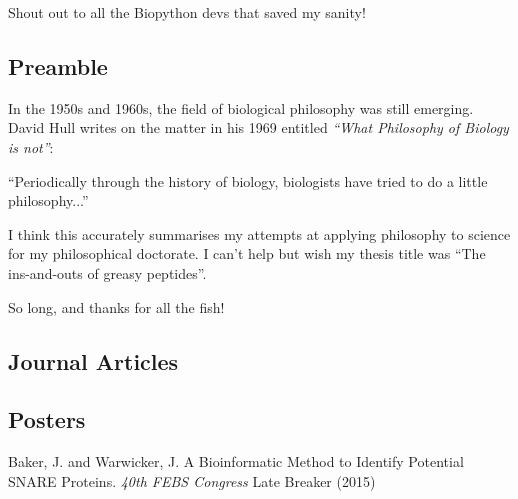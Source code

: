 \documentclass[12pt,PhD,twoside]{muthesis}
\begin{document}
Shout out to all the Biopython devs that saved my sanity!

\subsection*{Preamble} %
In the 1950s and 1960s, the field of biological philosophy was still emerging. David Hull writes on the matter in his 1969 entitled {\it``What Philosophy of Biology is not''}:

\begin{displayquote}
``Periodically through the history of biology, biologists have tried to do
a little philosophy...'' \cite{Hull1969}
\end{displayquote}

I think this accurately summarises my attempts at applying philosophy to science for my philosophical doctorate. I can't help but wish my thesis title was ``The ins-and-outs of greasy peptides''.

So long, and thanks for all the fish!


\subsection*{Journal Articles} %

\subsection*{Posters}
Baker, J. and Warwicker, J. A Bioinformatic Method to Identify Potential SNARE Proteins. {\it 40th FEBS Congress} Late Breaker (2015)

\afterpreface %







\printglossary[type=\acronymtype,title=Abbreviations]
\printglossary[title=Nomenclature] %

\printbibliography[title={Bibliography}]

\end{document}
